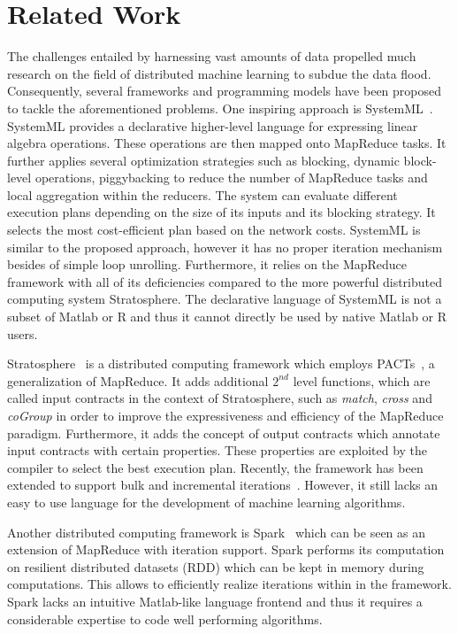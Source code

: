 \documentclass{dima}
\begin{document}
\section{Related Work}

The challenges entailed by harnessing vast amounts of data propelled much research on the field of distributed machine learning to subdue the data flood.
Consequently, several frameworks and programming models have been proposed to tackle the aforementioned problems.
One inspiring approach is SystemML~\cite{ghoting:2011a}.
SystemML provides a declarative higher-level language for expressing linear algebra operations.
These operations are then mapped onto MapReduce tasks.
It further applies several optimization strategies such as blocking, dynamic block-level operations, piggybacking to reduce the number of MapReduce tasks and local aggregation within the reducers.
The system can evaluate different execution plans depending on the size of its inputs and its blocking strategy.
It selects the most cost-efficient plan based on the network costs.
SystemML is similar to the proposed approach, however it has no proper iteration mechanism besides of simple loop unrolling.
Furthermore, it relies on the MapReduce framework with all of its deficiencies compared to the more powerful distributed computing system Stratosphere.
The declarative language of SystemML is not a subset of Matlab or R and thus it cannot directly be used by native Matlab or R users.

Stratosphere~\cite{battre:2010a} is a distributed computing framework which employs PACTs~\cite{alexandrov:2011a}, a generalization of MapReduce.
It adds additional $2^{nd}$ level functions, which are called input contracts in the context of Stratosphere, such as \emph{match}, \emph{cross} and \emph{coGroup} in order to improve the expressiveness and efficiency of the MapReduce paradigm.
Furthermore, it adds the concept of output contracts which annotate input contracts with certain properties.
These properties are exploited by the compiler to select the best execution plan.
Recently, the framework has been extended to support bulk and incremental iterations~\cite{ewen:pve2012a}.
However, it still lacks an easy to use language for the development of machine learning algorithms.

Another distributed computing framework is Spark~\cite{zaharia:2010a} which can be seen as an extension of MapReduce with iteration support.
Spark performs its computation on resilient distributed datasets (RDD) which can be kept in memory during computations.
This allows to efficiently realize iterations within in the framework.
Spark lacks an intuitive Matlab-like language frontend and thus it requires a considerable expertise to code well performing algorithms.
\end{document}
